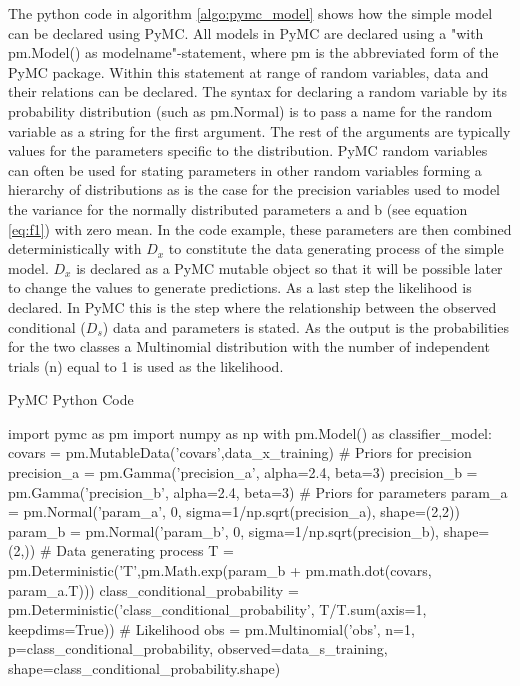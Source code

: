 \begin{example}
	The python code in algorithm \ref{algo:pymc_model} shows how the simple model can be declared using PyMC. All models in PyMC are declared using a "with pm.Model() as modelname"-statement, where pm is the abbreviated form of the PyMC package. Within this statement at range of random variables, data and their relations can be declared. The syntax for declaring a random variable by its probability distribution (such as pm.Normal) is to pass a name for the random variable as a string for the first argument. The rest of the arguments are typically values for the parameters specific to the distribution. PyMC random variables can often be used for stating parameters in other random variables forming a hierarchy of distributions as is the case for the precision variables used to model the variance for the normally distributed parameters a and b (see equation \ref{eq:f1}) with zero mean. In the code example, these parameters are then combined deterministically with $D_x$ to constitute the data generating process of the simple model. $D_x$ is declared as a PyMC mutable object so that it will be possible later to change the values to generate predictions. As a last step the likelihood is declared. In PyMC this is the step where the relationship between the observed conditional ($D_s$) data and parameters is stated. As the output is the probabilities for the two classes a Multinomial distribution with the number of independent trials (n) equal to 1 is used as the likelihood. 
	
	\begin{algorithm}[H]
		\label{algo:pymc_model}
		\caption{PyMC Python Code}
		\begin{python}
			import pymc as pm
			import numpy as np
			with pm.Model() as classifier_model:
			covars = pm.MutableData('covars',data_x_training) 
			# Priors for precision
			precision_a = pm.Gamma('precision_a', alpha=2.4, beta=3)
			precision_b = pm.Gamma('precision_b', alpha=2.4, beta=3)
			# Priors for parameters
			param_a = pm.Normal('param_a', 
			0, 
			sigma=1/np.sqrt(precision_a),
			shape=(2,2))
			param_b = pm.Normal('param_b', 
			0, 
			sigma=1/np.sqrt(precision_b),
			shape=(2,))
			# Data generating process
			T = pm.Deterministic('T',pm.Math.exp(param_b + pm.math.dot(covars, param_a.T)))
			class_conditional_probability = pm.Deterministic('class_conditional_probability', T/T.sum(axis=1, keepdims=True))
			# Likelihood
			obs = pm.Multinomial('obs', n=1, p=class_conditional_probability, observed=data_s_training, shape=class_conditional_probability.shape)
		\end{python}
	\end{algorithm}
	

\end{example}
